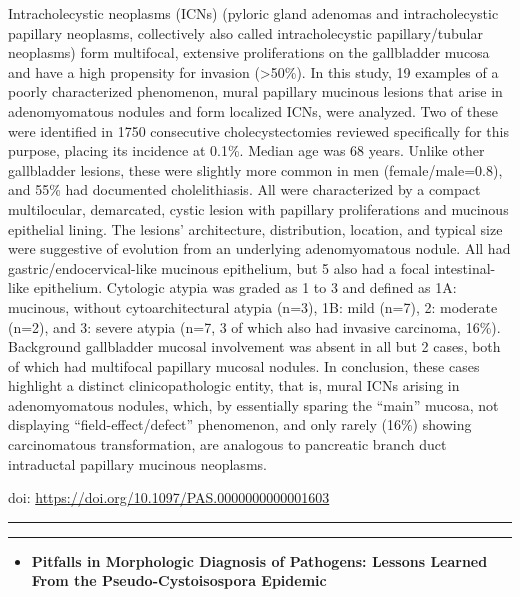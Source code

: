 \documentclass[
]{article}
\providecommand{\tightlist}{%
  \setlength{\itemsep}{0pt}\setlength{\parskip}{0pt}}
\begin{document}
Intracholecystic neoplasms (ICNs) (pyloric gland adenomas and
intracholecystic papillary neoplasms, collectively also called
intracholecystic papillary/tubular neoplasms) form multifocal, extensive
proliferations on the gallbladder mucosa and have a high propensity for
invasion (\textgreater50\%). In this study, 19 examples of a poorly
characterized phenomenon, mural papillary mucinous lesions that arise in
adenomyomatous nodules and form localized ICNs, were analyzed. Two of
these were identified in 1750 consecutive cholecystectomies reviewed
specifically for this purpose, placing its incidence at 0.1\%. Median
age was 68 years. Unlike other gallbladder lesions, these were slightly
more common in men (female/male=0.8), and 55\% had documented
cholelithiasis. All were characterized by a compact multilocular,
demarcated, cystic lesion with papillary proliferations and mucinous
epithelial lining. The lesions' architecture, distribution, location,
and typical size were suggestive of evolution from an underlying
adenomyomatous nodule. All had gastric/endocervical-like mucinous
epithelium, but 5 also had a focal intestinal-like epithelium. Cytologic
atypia was graded as 1 to 3 and defined as 1A: mucinous, without
cytoarchitectural atypia (n=3), 1B: mild (n=7), 2: moderate (n=2), and
3: severe atypia (n=7, 3 of which also had invasive carcinoma, 16\%).
Background gallbladder mucosal involvement was absent in all but 2
cases, both of which had multifocal papillary mucosal nodules. In
conclusion, these cases highlight a distinct clinicopathologic entity,
that is, mural ICNs arising in adenomyomatous nodules, which, by
essentially sparing the ``main'' mucosa, not displaying
``field-effect/defect'' phenomenon, and only rarely (16\%) showing
carcinomatous transformation, are analogous to pancreatic branch duct
intraductal papillary mucinous neoplasms.

doi: \url{https://doi.org/10.1097/PAS.0000000000001603}

\begin{center}\rule{0.5\linewidth}{0.5pt}\end{center}

\begin{center}\rule{0.5\linewidth}{0.5pt}\end{center}

\begin{itemize}
\tightlist
\item
  \textbf{Pitfalls in Morphologic Diagnosis of Pathogens: Lessons
  Learned From the Pseudo-Cystoisospora Epidemic}
\end{itemize}
\end{document}
